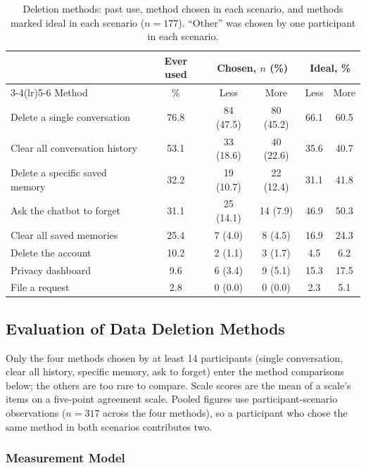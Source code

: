 \documentclass[conference,compsoc]{IEEEtran}
\begin{document}
\begin{table}[t]
\centering
\caption{Deletion methods: past use, method chosen in each scenario, and methods marked ideal in each scenario ($n=177$). ``Other'' was chosen by one participant in each scenario.}
\label{tab:method-usage}
\small
\begin{tabular}{lccccc}
\toprule
 & Ever used & \multicolumn{2}{c}{Chosen, $n$ (\%)} & \multicolumn{2}{c}{Ideal, \%} \\
\cmidrule(lr){3-4}\cmidrule(lr){5-6}
Method & \% & Less & More & Less & More \\
\midrule
Delete a single conversation & 76.8 & 84 (47.5) & 80 (45.2) & 66.1 & 60.5 \\
Clear all conversation history & 53.1 & 33 (18.6) & 40 (22.6) & 35.6 & 40.7 \\
Delete a specific saved memory & 32.2 & 19 (10.7) & 22 (12.4) & 31.1 & 41.8 \\
Ask the chatbot to forget & 31.1 & 25 (14.1) & 14 (7.9) & 46.9 & 50.3 \\
Clear all saved memories & 25.4 & 7 (4.0) & 8 (4.5) & 16.9 & 24.3 \\
Delete the account & 10.2 & 2 (1.1) & 3 (1.7) & 4.5 & 6.2 \\
Privacy dashboard & 9.6 & 6 (3.4) & 9 (5.1) & 15.3 & 17.5 \\
File a request & 2.8 & 0 (0.0) & 0 (0.0) & 2.3 & 5.1 \\
\bottomrule
\end{tabular}
\end{table}

\subsection{Evaluation of Data Deletion Methods}

Only the four methods chosen by at least 14 participants (single conversation, clear all history, specific memory, ask to forget) enter the method comparisons below; the others are too rare to compare. Scale scores are the mean of a scale's items on a five-point agreement scale. Pooled figures use participant-scenario observations ($n=317$ across the four methods), so a participant who chose the same method in both scenarios contributes two.

\subsubsection{Measurement Model}
\end{document}
